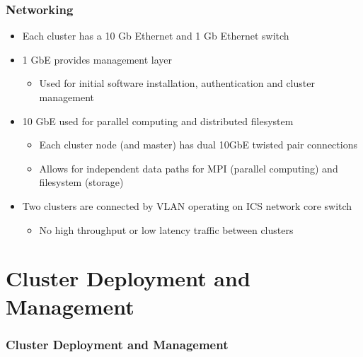 \documentclass[handout]{beamer}
\begin{document}
\begin{frame}
\frametitle{Networking}
\begin{itemize}
\item Each cluster has a 10 Gb Ethernet and 1 Gb Ethernet switch
\item 1 GbE provides management layer
\begin{itemize}
\item Used for initial software installation, authentication and cluster management
\end{itemize}
\item 10 GbE used for parallel computing and distributed filesystem
\begin{itemize}
\item Each cluster node (and master) has dual 10GbE twisted pair connections
\item Allows for independent data paths for MPI (parallel computing) and filesystem (storage)
\end{itemize}
\item Two clusters are connected by VLAN operating on ICS network core switch
\begin{itemize}
\item No high throughput or low latency traffic between clusters
\end{itemize}
\end{itemize}
\end{frame}

\section{Cluster Deployment and Management}

\begin{frame}
\frametitle{Cluster Deployment and Management}
\end{frame}
\end{document}

